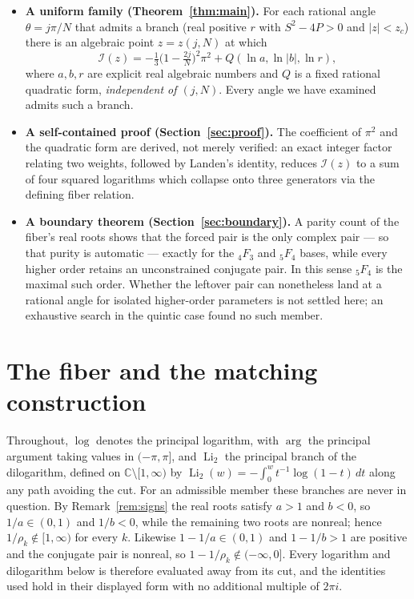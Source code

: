 \documentclass[11pt]{article}
\theoremstyle{definition}
\DeclareMathOperator{\Li}{Li}
\begin{document}
\begin{itemize}
\item \textbf{A uniform family (Theorem~\ref{thm:main}).} For each rational angle $\theta=j\pi/N$
that admits a branch (real positive $r$ with $S^2-4P>0$ and $|z|<z_c$) there is an algebraic point
$z=z(j,N)$ at which
\[
  \mathcal{I}(z)= -\tfrac13\Big(1-\tfrac{2j}{N}\Big)^2\pi^2 + Q(\ln a,\ln|b|,\ln r),
\]
where $a,b,r$ are explicit real algebraic numbers and $Q$ is a fixed rational quadratic form,
\emph{independent of $(j,N)$}. Every angle we have examined admits such a branch.
\item \textbf{A self-contained proof (Section~\ref{sec:proof}).} The coefficient of $\pi^2$ and the
quadratic form are derived, not merely verified: an exact integer factor relating two weights,
followed by Landen's identity, reduces $\mathcal{I}(z)$ to a sum of four squared logarithms which
collapse onto three generators via the defining fiber relation.
\item \textbf{A boundary theorem (Section~\ref{sec:boundary}).} A parity count of the fiber's real
roots shows that the forced pair is the only complex pair --- so that purity is automatic --- exactly
for the ${}_4F_3$ and ${}_5F_4$ bases, while every higher order retains an unconstrained conjugate
pair. In this sense ${}_5F_4$ is the maximal such order. Whether the leftover pair can nonetheless
land at a rational angle for isolated higher-order parameters is not settled here; an exhaustive
search in the quintic case found no such member.
\end{itemize}

\section{The fiber and the matching construction}\label{sec:setup}

Throughout, $\log$ denotes the principal logarithm, with $\arg$ the principal argument taking values
in $(-\pi,\pi]$, and $\Li_2$ the principal branch of the dilogarithm, defined on
$\mathbb{C}\setminus[1,\infty)$ by $\Li_2(w)=-\int_0^w t^{-1}\log(1-t)\,dt$ along any path avoiding
the cut. For an admissible member these branches are never in question. By Remark~\ref{rem:signs} the real
roots satisfy $a>1$ and $b<0$, so $1/a\in(0,1)$ and $1/b<0$, while the remaining two roots are
nonreal; hence $1/\rho_k\notin[1,\infty)$ for every $k$. Likewise $1-1/a\in(0,1)$ and $1-1/b>1$ are
positive and the conjugate pair is nonreal, so $1-1/\rho_k\notin(-\infty,0]$. Every logarithm and
dilogarithm below is therefore evaluated away from its cut, and the identities used hold in their
displayed form with no additional multiple of $2\pi i$.
\end{document}
